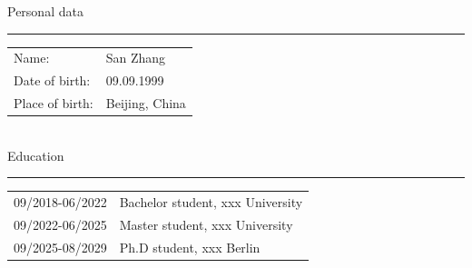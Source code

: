 \documentclass[a4paper,12pt,UTF8,openright]{book}
\begin{document}
\noindent Personal data

\noindent\rule{\textwidth}{0.4pt}

\vskip 0.1in

\begin{tabular}{p{}p{}}
	Name: & San Zhang \\
	Date of birth: & 09.09.1999 \\
	Place of birth: & Beijing, China \\
\end{tabular} \\

\noindent Education

\noindent\rule{\textwidth}{0.4pt}

\vskip 0.1in

\begin{tabular}{p{}p{}}
	09/2018-06/2022 & Bachelor student, xxx University \\
	09/2022-06/2025 & Master student, xxx University \\
	09/2025-08/2029 & Ph.D student, xxx Berlin \\
\end{tabular} \\
\end{document}
